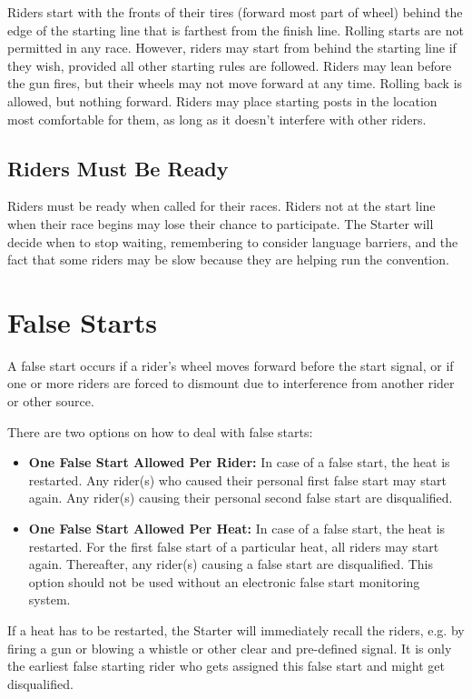 Riders start with the fronts of their tires (forward most part of wheel) behind the edge of the starting line that is farthest from the finish line.
Rolling starts are not permitted in any race.
However, riders may start from behind the starting line if they wish, provided all other starting rules are followed.
Riders may lean before the gun fires, but their wheels may not move forward at any time.
Rolling back is allowed, but nothing forward.
Riders may place starting posts in the location most comfortable for them, as long as it doesn't interfere with other riders.

\subsection{Riders Must Be Ready}
Riders must be ready when called for their races.
Riders not at the start line when their race begins may lose their chance to participate.
The Starter will decide when to stop waiting, remembering to consider language barriers, and the fact that some riders may be slow because they are helping run the convention.

\section{False Starts}
A false start occurs if a rider's wheel moves forward before the start signal, or if one or more riders are forced to dismount due to interference from another rider or other source.

There are two options on how to deal with false starts:
\begin{itemize}
\item \textbf{One False Start Allowed Per Rider:}
In case of a false start, the heat is restarted.
Any rider(s) who caused their personal first false start may start again.
Any rider(s) causing their personal second false start are disqualified.
\item \textbf{One False Start Allowed Per Heat:} 
In case of a false start, the heat is restarted.
For the first false start of a particular heat, all riders may start again.
Thereafter, any rider(s) causing a false start are disqualified.
This option should not be used without an electronic false start monitoring system.
\end{itemize}
If a heat has to be restarted, the Starter will immediately recall the riders, e.g. by firing a gun or blowing a whistle or other clear and pre-defined signal.
It is only the earliest false starting rider who gets assigned this false start and might get disqualified.

